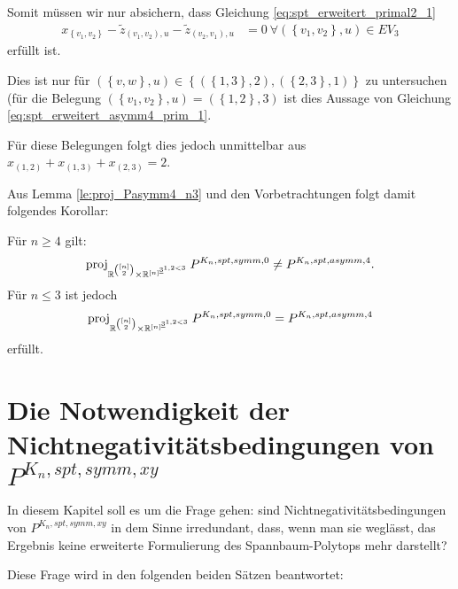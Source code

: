 \documentclass[10p,a4paper,BCOR = 12mm, DIV=15]{scrbook}
\begin{document}
\begin{bew}
Somit müssen wir nur absichern, dass Gleichung \eqref{eq:spt_erweitert_primal2_1}
\begin{eqnarray*}
x_{\left\{v_1, v_2\right\}} - \widetilde{z}_{\left(v_1, v_2\right), u} - \widetilde{z}_{\left(v_2, v_1\right), u} & = 0\ \forall \left(\left\{v_1, v_2\right\}, u\right)\in EV_3
\end{eqnarray*}
erfüllt ist.

Dies ist nur für $\left(\left\{v, w\right\}, u\right) \in \left\{\left(\left\{1, 3\right\}, 2\right), \left(\left\{2, 3\right\}, 1\right)\right\}$ zu untersuchen 
(für die Belegung $\left(\left\{v_1, v_2\right\}, u\right) = \left(\left\{1, 2\right\}, 3\right)$ ist dies Aussage von Gleichung \eqref{eq:spt_erweitert_asymm4_prim_1}.

Für diese Belegungen folgt dies jedoch unmittelbar aus $x_{\left(1, 2\right)} + x_{\left(1, 3\right)} + x_{\left(2, 3\right)} = 2$.
\end{bew}

Aus Lemma \ref{le:proj_Pasymm4_n3} und den Vorbetrachtungen folgt damit folgendes Korollar:
\begin{Kor}
Für $n\geq 4$ gilt:
\begin{displaymath}
\operatorname{proj}_{\mathbb{R}^{\left[n\right] \choose 2} \times \mathbb{R}^{\left[n\right]^{\underline{3}^{1,2<3}}}} P^{K_n, spt, symm, 0} \neq P^{K_n, spt, asymm, 4}.
\end{displaymath}
Für $n\leq 3$ ist jedoch
\begin{displaymath}
\operatorname{proj}_{\mathbb{R}^{\left[n\right] \choose 2} \times \mathbb{R}^{\left[n\right]^{\underline{3}^{1,2<3}}}} P^{K_n, spt, symm, 0} = P^{K_n, spt, asymm, 4}
\end{displaymath}
erfüllt.
\end{Kor}

\chapter{Die Notwendigkeit der Nichtnegativitätsbedingungen von $P^{K_n, spt, symm, xy}$}

In diesem Kapitel soll es um die Frage gehen: sind Nichtnegativitätsbedingungen von $P^{K_n, spt, symm, xy}$ in dem Sinne irredundant, dass, wenn man sie weglässt, das Ergebnis keine erweiterte Formulierung des Spannbaum-Polytops mehr darstellt?

Diese Frage wird in den folgenden beiden Sätzen beantwortet:
\end{document}
